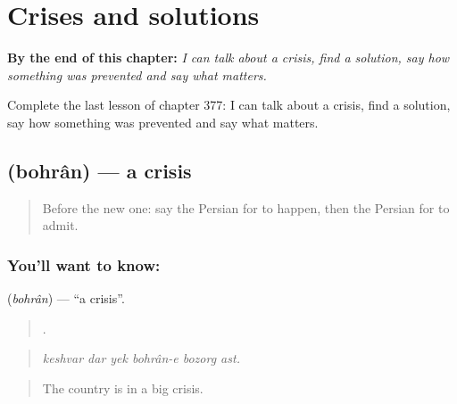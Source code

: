 
\chapter{Crises and solutions}
\label{ch:fa-crises-and-solutions}

\begin{chapteropening}
\textbf{By the end of this chapter:} \emph{I can talk about a crisis, find a solution, say how something was prevented and say what matters.}

Complete the last lesson of chapter 377: I can talk about a crisis, find a solution, say how something was prevented and say what matters.
\end{chapteropening}

\section[\texorpdfstring{\fa{بحران} (bohrân)}{بحران (bohrân)}]{ (bohrân) — a crisis}

\label{lesson:FA-C377-bohran}



\begin{quote}
Before the new one: say the Persian for to happen, then the Persian for to admit.
\end{quote}

\subsection*{You'll want to know: }
\textbf{} (\emph{bohrân}) — \textquotedblleft{}a crisis\textquotedblright{}.

\begin{quote}
     .
\end{quote}

\begin{quote}
\emph{keshvar dar yek bohrân-e bozorg ast.}
\end{quote}

\begin{quote}
The country is in a big crisis.
\end{quote}

